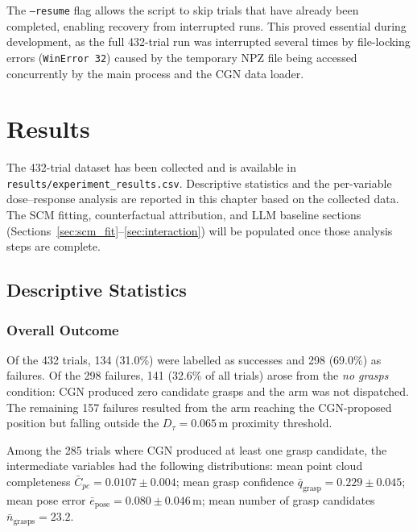 \documentclass[11pt,a4paper]{report}
\begin{document}
The \texttt{--resume} flag allows the script to skip trials that have already been completed, enabling recovery from interrupted runs. This proved essential during development, as the full 432-trial run was interrupted several times by file-locking errors (\texttt{WinError~32}) caused by the temporary NPZ file being accessed concurrently by the main process and the CGN data loader.


\chapter{Results}
\label{ch:results}

The 432-trial dataset has been collected and is available in \texttt{results/experiment\_results.csv}. Descriptive statistics and the per-variable dose--response analysis are reported in this chapter based on the collected data. The SCM fitting, counterfactual attribution, and LLM baseline sections (Sections~\ref{sec:scm_fit}--\ref{sec:interaction}) will be populated once those analysis steps are complete.

\section{Descriptive Statistics}
\label{sec:descriptive}

\subsection{Overall Outcome}

Of the 432 trials, 134 (31.0\%) were labelled as successes and 298 (69.0\%) as failures. Of the 298 failures, 141 (32.6\% of all trials) arose from the \textit{no grasps} condition: CGN produced zero candidate grasps and the arm was not dispatched. The remaining 157 failures resulted from the arm reaching the CGN-proposed position but falling outside the $D_\tau = 0.065$\,m proximity threshold.

Among the 285 trials where CGN produced at least one grasp candidate, the intermediate variables had the following distributions: mean point cloud completeness $\bar{C}_{pc} = 0.0107 \pm 0.004$; mean grasp confidence $\bar{q}_{\text{grasp}} = 0.229 \pm 0.045$; mean pose error $\bar{e}_{\text{pose}} = 0.080 \pm 0.046$\,m; mean number of grasp candidates $\bar{n}_{\text{grasps}} = 23.2$.
\end{document}
